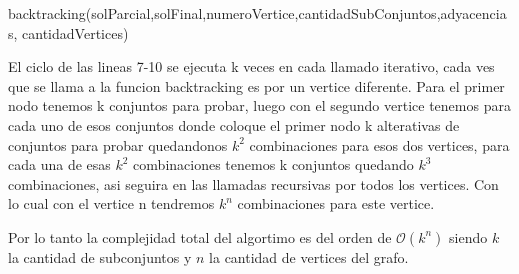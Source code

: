 \begin{algorithm}
 \begin{algorithmic}[1]\parskip=1mm
 \caption{backtracking(solParcial,solFinal,numeroVertice,cantidadSubConjuntos,adyacencias, cantidadVertices)}
  \end{algorithmic}
  \end{algorithm}

El ciclo de las lineas 7-10 se ejecuta k veces en cada llamado iterativo, cada ves que se llama a la funcion backtracking es por un vertice diferente. 
Para el primer nodo tenemos k conjuntos para probar, luego con el segundo vertice tenemos para cada uno de esos conjuntos donde coloque el primer nodo k alterativas de conjuntos para probar quedandonos $k^2$ combinaciones para esos dos vertices,
para cada una de esas $k^2$ combinaciones tenemos k conjuntos quedando $k^3$ combinaciones, asi seguira en las llamadas recursivas por todos los vertices. Con lo cual con el vertice n tendremos $k^n$ combinaciones para este vertice.

Por lo tanto la complejidad total del algortimo es del orden de $\mathcal{O}(k^n)$ siendo $k$ la cantidad de subconjuntos y $n$ la cantidad de vertices del grafo.

